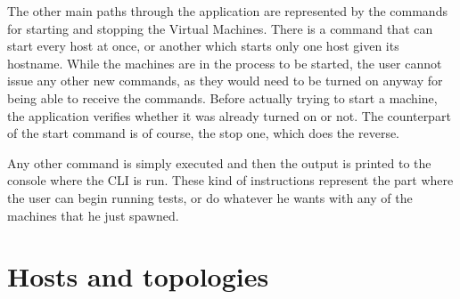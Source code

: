 The other main paths through the application are represented by the commands for starting and stopping the Virtual Machines.
There is a command that can start every host at once, or another which starts only one host given its hostname.
While the machines are in the process to be started, the user cannot issue any other new commands, as they would need to be turned on anyway for being able to receive the commands.
Before actually trying to start a machine, the application verifies whether it was already turned on or not.
The counterpart of the start command is of course, the stop one, which does the reverse.

Any other command is simply executed and then the output is printed to the console where the CLI is run.
These kind of instructions represent the part where the user can begin running tests, or do whatever he wants with any of the machines that he just spawned.

\section{Hosts and topologies}
\label{sec:hosts-and-topologies}


